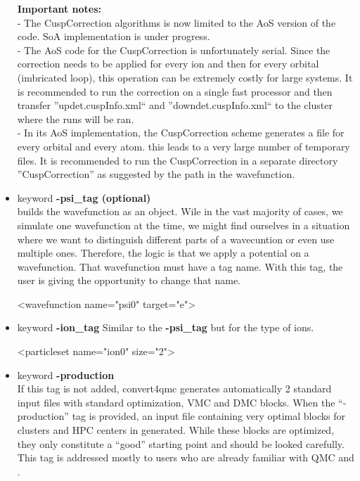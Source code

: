 \begin{itemize}
\textbf{Important notes:}\\
- The CuspCorrection algorithms is now limited to the AoS version of the code. SoA implementation is under progress. \\
- The AoS code for the CuspCorrection is unfortunately serial. Since the correction needs to be applied for every ion and then for every orbital (imbricated loop), this operation can be extremely costly for large systems. It is recommended to run the correction on a single fast processor and then transfer ''updet.cuspInfo.xml`` and ''downdet.cuspInfo.xml`` to the cluster where the runs will be ran. \\
- In its AoS implementation, the CuspCorrection scheme generates a file for every orbital and every atom. this leads to a very large number of temporary files. It is recommended to run the CuspCorrection in a separate directory ''CuspCorrection'' as suggested by the path in the wavefunction. \\

\item keyword \textbf{-psi\_tag (optional)}\\
\qmcpack builds the wavefunction as an object. Wile in the vast majority of cases, we simulate one wavefunction at the time, we might find ourselves in a situation where we want to distinguish different parts of a wavecuntion or even use multiple ones. Therefore, the logic is that we apply a potential on a wavefunction. That wavefunction must have a tag name. With this tag, the user is giving the opportunity to change that name. 

\begin{shade}
   <wavefunction name="psi0" target="e">
\end{shade}

\item keyword \textbf{-ion\_tag}
Similar to the \textbf{-psi\_tag} but for the type of ions. \\
\begin{shade}
  <particleset name="ion0" size="2">
\end{shade}


\item keyword \textbf{-production}\\

If this tag is not added, convert4qmc generates automatically 2 standard input files with standard optimization, VMC and DMC blocks. When the ``-production'' tag is provided, an input file containing very optimal blocks for clusters and HPC centers in generated. While these blocks are optimized, they only constitute a ``good'' starting point and should be looked carefully. This tag is addressed mostly to users who are already familiar with QMC and \qmcpack.  

\end{itemize}

